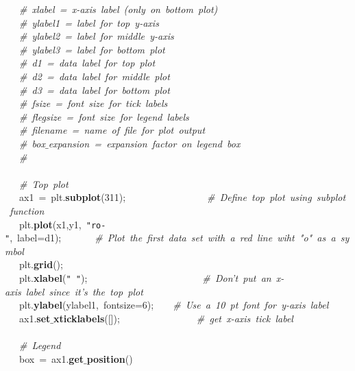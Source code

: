\mbox{}\ \ \ \textit{\#\ xlabel\ =\ x-axis\ label\ (only\ on\ bottom\ plot)} \\
\mbox{}\ \ \ \textit{\#\ ylabel1\ =\ label\ for\ top\ y-axis} \\
\mbox{}\ \ \ \textit{\#\ ylabel2\ =\ label\ for\ middle\ y-axis} \\
\mbox{}\ \ \ \textit{\#\ ylabel3\ =\ label\ for\ bottom\ plot} \\
\mbox{}\ \ \ \textit{\#\ d1\ =\ data\ label\ for\ top\ plot} \\
\mbox{}\ \ \ \textit{\#\ d2\ =\ data\ label\ for\ middle\ plot} \\
\mbox{}\ \ \ \textit{\#\ d3\ =\ data\ label\ for\ bottom\ plot} \\
\mbox{}\ \ \ \textit{\#\ fsize\ =\ font\ size\ for\ tick\ labels} \\
\mbox{}\ \ \ \textit{\#\ flegsize\ =\ font\ size\ for\ legend\ labels} \\
\mbox{}\ \ \ \textit{\#\ filename\ =\ name\ of\ file\ for\ plot\ output} \\
\mbox{}\ \ \ \textit{\#\ box$\_$expansion\ =\ expansion\ factor\ on\ legend\ box} \\
\mbox{}\ \ \ \textit{\#} \\
\mbox{}\ \ \  \\
\mbox{}\ \ \ \textit{\#\ Top\ plot} \\
\mbox{}\ \ \ ax1\ =\ plt.\textbf{subplot}(311);\ \ \ \ \ \ \ \ \ \ \ \ \ \ \ \ \ \textit{\#\ Define\ top\ plot\ using\ subplot\ function} \\
\mbox{}\ \ \ plt.\textbf{plot}(x1,y1,\ \texttt{"{}ro-"{}},\ label=d1);\ \ \ \ \ \ \ \textit{\#\ Plot\ the\ first\ data\ set\ with\ a\ red\ line\ wiht\ "{}o"{}\ as\ a\ symbol} \\
\mbox{}\ \ \ plt.\textbf{grid}(); \\
\mbox{}\ \ \ plt.\textbf{xlabel}(\texttt{"{}\ "{}});\ \ \ \ \ \ \ \ \ \ \ \ \ \ \ \ \ \ \ \ \ \ \ \ \textit{\#\ Don't\ put\ an\ x-axis\ label\ since\ it's\ the\ top\ plot} \\
\mbox{}\ \ \ plt.\textbf{ylabel}(ylabel1,\ fontsize=6);\ \ \ \ \textit{\#\ Use\ a\ 10\ pt\ font\ for\ y-axis\ label} \\
\mbox{}\ \ \ ax1.\textbf{set$\_$xticklabels}([]);\ \ \ \ \ \ \ \ \ \ \ \ \ \ \ \ \textit{\#\ get\ x-axis\ tick\ label} \\
\mbox{}\ \ \  \\
\mbox{}\ \ \ \textit{\#\ Legend} \\
\mbox{}\ \ \ box\ =\ ax1.\textbf{get$\_$position}() \\
